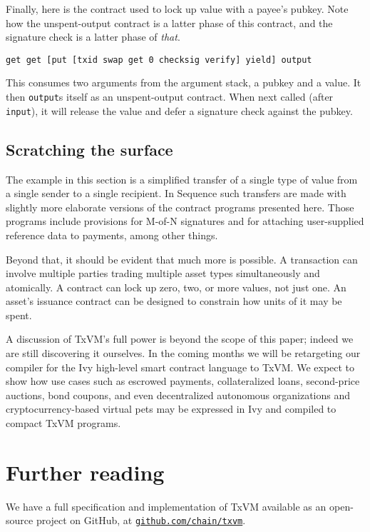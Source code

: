 \documentclass{article}
\newcommand{\txvm}{TxVM}
\begin{document}
Finally, here is the contract used to lock up value with a payee's
pubkey. Note how the unspent-output contract is a latter phase of this
contract, and the signature check is a latter phase of \emph{that}.

\begin{verbatim}
get get [put [txid swap get 0 checksig verify] yield] output
\end{verbatim}

This consumes two arguments from the argument stack, a pubkey and a
value. It then \texttt{output}s itself as an unspent-output
contract. When next called (after \texttt{input}), it will release the
value and defer a signature check against the pubkey.

\subsection{Scratching the surface}

The example in this section is a simplified transfer of a single type
of value from a single sender to a single recipient. In Sequence such
transfers are made with slightly more elaborate versions of the
contract programs presented here. Those programs include provisions
for M-of-N signatures and for attaching user-supplied reference data
to payments, among other things.

Beyond that, it should be evident that much more is possible. A
transaction can involve multiple parties trading multiple asset types
simultaneously and atomically. A contract can lock up zero, two, or
more values, not just one.  An asset's issuance contract can be
designed to constrain how units of it may be spent.

A discussion of TxVM's full power is beyond the scope of this paper;
indeed we are still discovering it ourselves. In the coming months we
will be retargeting our compiler for the Ivy high-level smart contract
language to TxVM. We expect to show how use cases such as escrowed
payments, collateralized loans, second-price auctions, bond coupons,
and even decentralized autonomous organizations and
cryptocurrency-based virtual pets may be expressed in Ivy and compiled
to compact TxVM programs.

\section{Further reading}

We have a full specification and implementation of \txvm{} available
as an open-source project on GitHub, at
\href{https://github.com/chain/txvm}{\texttt{github.com/chain/txvm}}.
\end{document}
